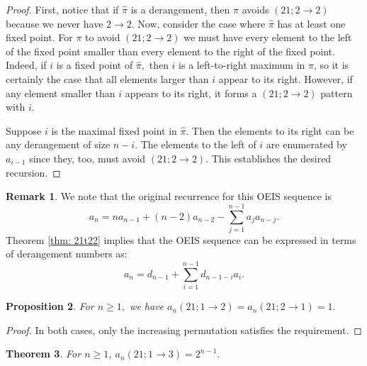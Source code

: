 \documentclass[11pt]{article}
\newtheorem{theorem}{Theorem}[section]
\newtheorem{proposition}[theorem]{Proposition}
\theoremstyle{definition}
\newtheorem{remark}[theorem]{Remark}
\begin{document}
\begin{proof}
    First, notice that if $\hat\pi$ is a derangement, then $\pi$ avoids $(21;2 \to 2)$ because we never have $2 \to 2$. Now, consider the case where $\hat\pi$ has at least one fixed point. For $\pi$ to avoid $(21; 2 \to 2)$ we must have every element to the left of the fixed point smaller than every element to the right of the fixed point. Indeed, if $i$ is a fixed point of $\hat\pi,$ then $i$ is a left-to-right maximum in $\pi$, so it is certainly the case that all elements larger than $i$ appear to its right. However, if any element smaller than $i$ appears to its right, it forms a $(21;2\to2)$ pattern with $i$.

    Suppose $i$ is the maximal fixed point in $\hat\pi$. Then the elements to its right can be any derangement of size $n-i$. The elements to the left of $i$ are enumerated by $a_{i-1}$ since they, too, must avoid $(21;2 \to 2)$. This establishes the desired recursion.
\end{proof}

\begin{remark}
    We note that the original recurrence for this OEIS sequence is
    \[
    a_n = n a_{n-1} + (n-2) a_{n-2} - \sum_{j=1}^{n-1} a_j a_{n-j}.
    \]
    Theorem \ref{thm: 21t22} implies that the OEIS sequence can be expressed in terms of derangement numbers as:
    \[
    a_n = d_{n-1} + \sum_{i=1}^{n-1} d_{n-1-i} a_i.
    \]
\end{remark}

\begin{proposition} \label{prop: 21t12}
    For $n\geq 1,$ we have $a_n(21;1\to 2)=a_n(21; 2\to1) = 1.$
\end{proposition}
\begin{proof}
    In both cases, only the increasing permutation satisfies the requirement. 
\end{proof}


\begin{theorem} \label{thm: 21t13}
    For $n\geq 1$, $a_n(21; 1\to 3) = 2^{n-1}.$
\end{theorem}
\end{document}
